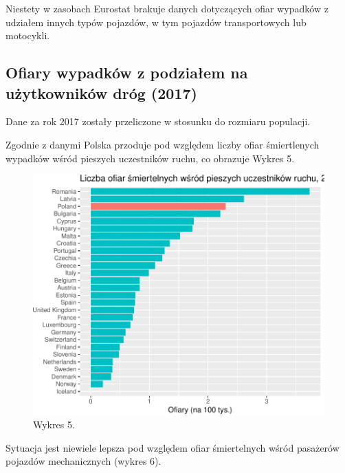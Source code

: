 \documentclass[
]{article}
\begin{document}
Niestety w zasobach Eurostat brakuje danych dotyczących ofiar wypadków z
udziałem innych typów pojazdów, w tym pojazdów transportowych lub
motocykli.

\hypertarget{ofiary-wypadkuxf3w-z-podziaux142em-na-uux17cytkownikuxf3w-druxf3g-2017}{%
\subsection{Ofiary wypadków z podziałem na użytkowników dróg
(2017)}\label{ofiary-wypadkuxf3w-z-podziaux142em-na-uux17cytkownikuxf3w-druxf3g-2017}}

Dane za rok 2017 zostały przeliczone w stosunku do rozmiaru populacji.

Zgodnie z danymi Polska przoduje pod względem liczby ofiar śmiertlenych
wypadków wśród pieszych uczestników ruchu, co obrazuje Wykres 5.

\begin{figure}

\includegraphics{raport_wypadki_files/figure-latex/unnamed-chunk-11-1} \hfill{}

\caption{Wykres 5.}\label{fig:unnamed-chunk-11}
\end{figure}

Sytuacja jest niewiele lepsza pod względem ofiar śmiertelnych wśród
pasażerów pojazdów mechanicznych (wykres 6).
\end{document}
